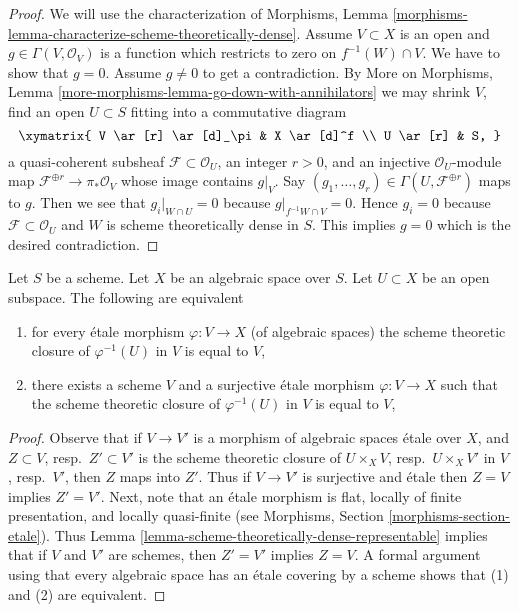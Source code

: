 \begin{proof}
We will use the characterization of Morphisms, Lemma
\ref{morphisms-lemma-characterize-scheme-theoretically-dense}.
Assume $V \subset X$ is an open and $g \in \Gamma(V, \mathcal{O}_V)$
is a function which restricts to zero on $f^{-1}(W) \cap V$.
We have to show that $g = 0$. Assume $g \not = 0$ to get a
contradiction. By
More on Morphisms, Lemma \ref{more-morphisms-lemma-go-down-with-annihilators}
we may shrink $V$, find an open $U \subset S$ fitting into a
commutative diagram
$$
\xymatrix{
V \ar[r] \ar[d]_\pi & X \ar[d]^f \\
U \ar[r] & S,
}
$$
a quasi-coherent subsheaf $\mathcal{F} \subset \mathcal{O}_U$, an integer
$r > 0$, and an injective $\mathcal{O}_U$-module map
$\mathcal{F}^{\oplus r} \to \pi_*\mathcal{O}_V$
whose image contains $g|_V$. Say
$(g_1, \ldots, g_r) \in \Gamma(U, \mathcal{F}^{\oplus r})$ maps to $g$.
Then we see that $g_i|_{W \cap U} = 0$ because $g|_{f^{-1}W \cap V} = 0$.
Hence $g_i = 0$ because $\mathcal{F} \subset \mathcal{O}_U$ and
$W$ is scheme theoretically dense in $S$.
This implies $g = 0$ which is the desired contradiction.
\end{proof}

\begin{lemma}
\label{lemma-scheme-theoretically-dense}
Let $S$ be a scheme.
Let $X$ be an algebraic space over $S$.
Let $U \subset X$ be an open subspace.
The following are equivalent
\begin{enumerate}
\item for every \'etale morphism $\varphi : V \to X$ (of algebraic spaces)
the scheme theoretic closure of $\varphi^{-1}(U)$ in $V$ is equal to $V$,
\item there exists a scheme $V$ and a surjective \'etale morphism
$\varphi : V \to X$ such that the scheme theoretic closure of
$\varphi^{-1}(U)$ in $V$ is equal to $V$,
\end{enumerate}
\end{lemma}

\begin{proof}
Observe that if $V \to V'$ is a morphism of algebraic spaces \'etale
over $X$, and $Z \subset V$, resp.\ $Z' \subset V'$ is the scheme theoretic
closure of $U \times_X V$, resp.\ $U \times_X V'$ in $V$, resp.\ $V'$,
then $Z$ maps into $Z'$. Thus if $V \to V'$ is surjective and \'etale
then $Z = V$ implies $Z' = V'$. Next, note that an \'etale morphism is
flat, locally of finite presentation, and locally quasi-finite
(see Morphisms, Section \ref{morphisms-section-etale}).
Thus Lemma \ref{lemma-scheme-theoretically-dense-representable}
implies that if $V$ and $V'$ are schemes, then $Z' = V'$ implies
$Z = V$. A formal argument using that every algebraic space has an
\'etale covering by a scheme shows that (1) and (2) are equivalent.
\end{proof}

